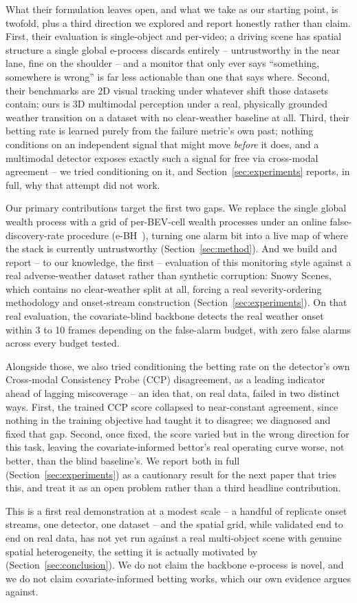 What their formulation leaves open, and what we take as our starting point, is twofold, plus a third direction we explored and report honestly rather than claim. First, their evaluation is single-object and per-video; a driving scene has spatial structure a single global e-process discards entirely -- untrustworthy in the near lane, fine on the shoulder -- and a monitor that only ever says ``something, somewhere is wrong'' is far less actionable than one that says where. Second, their benchmarks are 2D visual tracking under whatever shift those datasets contain; ours is 3D multimodal perception under a real, physically grounded weather transition on a dataset with no clear-weather baseline at all. Third, their betting rate is learned purely from the failure metric's own past; nothing conditions on an independent signal that might move \emph{before} it does, and a multimodal detector exposes exactly such a signal for free via cross-modal agreement -- we tried conditioning on it, and Section~\ref{sec:experiments} reports, in full, why that attempt did not work.

Our primary contributions target the first two gaps. We replace the single global wealth process with a grid of per-BEV-cell wealth processes under an online false-discovery-rate procedure (e-BH~\cite{WangRamdas2022JRSSB}), turning one alarm bit into a live map of where the stack is currently untrustworthy (Section~\ref{sec:method}). And we build and report -- to our knowledge, the first -- evaluation of this monitoring style against a real adverse-weather dataset rather than synthetic corruption: Snowy Scenes, which contains no clear-weather split at all, forcing a real severity-ordering methodology and onset-stream construction (Section~\ref{sec:experiments}). On that real evaluation, the covariate-blind backbone detects the real weather onset within 3 to 10 frames depending on the false-alarm budget, with zero false alarms across every budget tested.

Alongside those, we also tried conditioning the betting rate on the detector's own Cross-modal Consistency Probe (CCP) disagreement, as a leading indicator ahead of lagging miscoverage -- an idea that, on real data, failed in two distinct ways. First, the trained CCP score collapsed to near-constant agreement, since nothing in the training objective had taught it to disagree; we diagnosed and fixed that gap. Second, once fixed, the score varied but in the wrong direction for this task, leaving the covariate-informed bettor's real operating curve worse, not better, than the blind baseline's. We report both in full (Section~\ref{sec:experiments}) as a cautionary result for the next paper that tries this, and treat it as an open problem rather than a third headline contribution.

This is a first real demonstration at a modest scale -- a handful of replicate onset streams, one detector, one dataset -- and the spatial grid, while validated end to end on real data, has not yet run against a real multi-object scene with genuine spatial heterogeneity, the setting it is actually motivated by (Section~\ref{sec:conclusion}). We do not claim the backbone e-process is novel, and we do not claim covariate-informed betting works, which our own evidence argues against.
